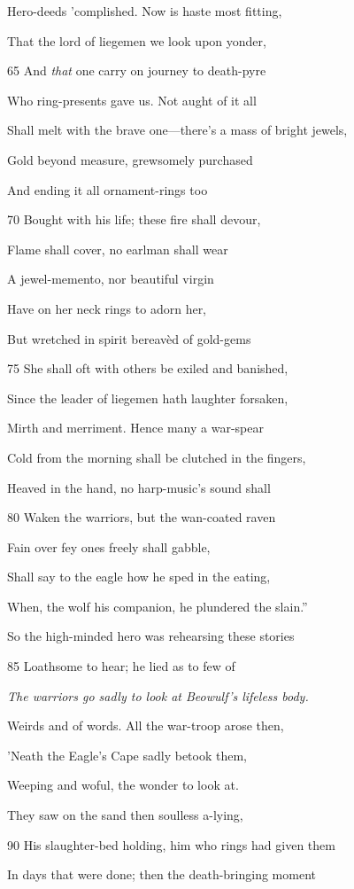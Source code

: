 Hero-deeds ’complished. Now is haste most fitting,

That the lord of liegemen we look upon yonder,

65
And \emph{that} one carry on journey to death-pyre

Who ring-presents gave us. Not aught of it all

Shall melt with the brave one—there’s a mass of bright jewels,

Gold beyond measure, grewsomely purchased

And ending it all ornament-rings too

70
Bought with his life; these fire shall devour,

Flame shall cover, no earlman shall wear

A jewel-memento, nor beautiful virgin

Have on her neck rings to adorn her,

But wretched in spirit bereavèd of gold-gems

75
She shall oft with others be exiled and banished,

Since the leader of liegemen hath laughter forsaken,

Mirth and merriment. Hence many a war-spear

Cold from the morning shall be clutched in the fingers,

Heaved in the hand, no harp-music’s sound shall

80
Waken the warriors, but the wan-coated raven

Fain over fey ones freely shall gabble,

Shall say to the eagle how he sped in the eating,

When, the wolf his companion, he plundered the slain.”

So the high-minded hero was rehearsing these stories

85
Loathsome to hear; he lied as to few of

\emph{The warriors go
sadly to look at
Beowulf’s lifeless
body.}

Weirds and of words. All the war-troop arose then,

’Neath the Eagle’s Cape sadly betook them,

Weeping and woful, the wonder to look at.

They saw on the sand then soulless a-lying,

90
His slaughter-bed holding, him who rings had given them

In days that were done; then the death-bringing moment

